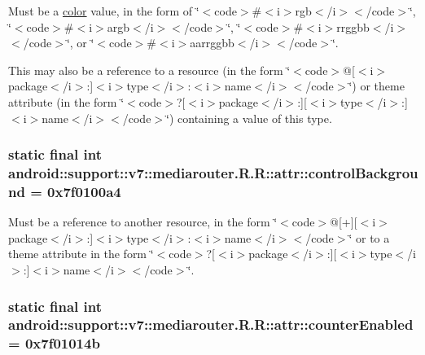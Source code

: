 Must be a \hyperlink{classandroid_1_1support_1_1v7_1_1mediarouter_1_1_r_1_1color}{color} value, in the form of \char`\"{}$<$code$>$\#$<$i$>$rgb$<$/i$>$$<$/code$>$\char`\"{}, \char`\"{}$<$code$>$\#$<$i$>$argb$<$/i$>$$<$/code$>$\char`\"{}, \char`\"{}$<$code$>$\#$<$i$>$rrggbb$<$/i$>$$<$/code$>$\char`\"{}, or \char`\"{}$<$code$>$\#$<$i$>$aarrggbb$<$/i$>$$<$/code$>$\char`\"{}. 

This may also be a reference to a resource (in the form \char`\"{}$<$code$>$@\mbox{[}$<$i$>$package$<$/i$>$:\mbox{]}$<$i$>$type$<$/i$>$:$<$i$>$name$<$/i$>$$<$/code$>$\char`\"{}) or theme attribute (in the form \char`\"{}$<$code$>$?\mbox{[}$<$i$>$package$<$/i$>$:\mbox{]}\mbox{[}$<$i$>$type$<$/i$>$:\mbox{]}$<$i$>$name$<$/i$>$$<$/code$>$\char`\"{}) containing a value of this type. \hypertarget{classandroid_1_1support_1_1v7_1_1mediarouter_1_1_r_1_1attr_355cb45c9297056c4b4b0933516165b7}{
\subsubsection[{controlBackground}]{\setlength{\rightskip}{0pt plus 5cm}static final int android::support::v7::mediarouter.R.R::attr::controlBackground = 0x7f0100a4}}
\label{classandroid_1_1support_1_1v7_1_1mediarouter_1_1_r_1_1attr_355cb45c9297056c4b4b0933516165b7}


Must be a reference to another resource, in the form \char`\"{}$<$code$>$@\mbox{[}+\mbox{]}\mbox{[}$<$i$>$package$<$/i$>$:\mbox{]}$<$i$>$type$<$/i$>$:$<$i$>$name$<$/i$>$$<$/code$>$\char`\"{} or to a theme attribute in the form \char`\"{}$<$code$>$?\mbox{[}$<$i$>$package$<$/i$>$:\mbox{]}\mbox{[}$<$i$>$type$<$/i$>$:\mbox{]}$<$i$>$name$<$/i$>$$<$/code$>$\char`\"{}. \hypertarget{classandroid_1_1support_1_1v7_1_1mediarouter_1_1_r_1_1attr_6f2181796681edaef1b361f92f94524b}{
\subsubsection[{counterEnabled}]{\setlength{\rightskip}{0pt plus 5cm}static final int android::support::v7::mediarouter.R.R::attr::counterEnabled = 0x7f01014b}}
\label{classandroid_1_1support_1_1v7_1_1mediarouter_1_1_r_1_1attr_6f2181796681edaef1b361f92f94524b}


